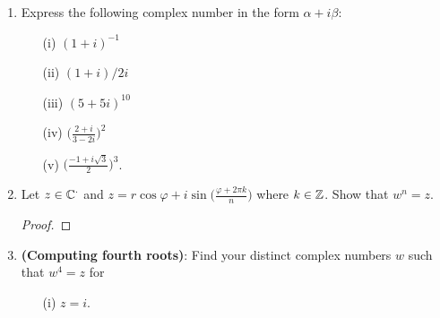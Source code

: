 \documentclass[a4paper]{article}
\begin{document}
\begin{enumerate}
\begin{proof}
        \end{proof}
    \item Express the following complex number in the form \( \alpha + i \beta  \):
        \begin{enumerate}
            \item[(i)] \( (1 + i)^{-1} \)
                \begin{solution}
                    
                \end{solution}
            \item[(ii)] \( (1 + i) / 2i \)
                \begin{solution}
                    
                \end{solution}
            \item[(iii)] \( (5 + 5i)^{10} \)
                \begin{solution}
                    
                \end{solution}
            \item[(iv)] \( \Big(  \frac{ 2 + i  }{ 3 -2i }  \Big)^{2} \)
                \begin{solution}
                    
                \end{solution}
            \item[(v)] \( \Big(  \frac{ - 1 + i \sqrt{ 3 }  }{ 2 }  \Big)^{3} \).
                \begin{solution}
                    
                \end{solution}
        \end{enumerate}
    \item Let \( z \in \mathbb{C}^{\cdot} \) and \( z = r \cos \varphi + i \sin \Big(  \frac{ \varphi + 2 \pi k  }{ n }   \Big) \) where \( k \in \mathbb{Z}  \). Show that \( w^{n} = z  \).
        \begin{proof}
        
        \end{proof}
    \item \textbf{(Computing fourth roots)}: Find your distinct complex numbers \( w  \) such that \( w^{4} = z  \) for 
        \begin{enumerate}
            \item[(i)] \( z = i  \).
                \begin{solution}
                

\end{solution}
\end{enumerate}
\end{enumerate}
\end{document}
